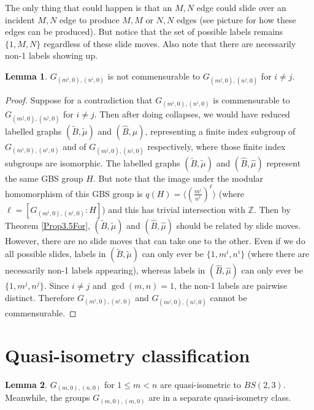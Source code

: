 \documentclass[10pt]{article}
\def\integers{{\mathbb{Z}}}
\theoremstyle{definition}
\newtheorem{lemma}{Lemma}
\begin{document}
The only thing that could happen is that an $M,N$ edge could slide over an incident $M,N$ edge to produce $M,M$ or $N,N$ edges (see picture for how these edges can be produced). But notice that the set of possible labels remains $\{1,M,N\}$ regardless of these slide moves. Also note that there are necessarily non-1 labels showing up. 

\begin{lemma}
    $G_{(m^i,0),(n^i,0)}$ is not commensurable to $G_{(m^j,0),(n^j,0)}$ for $i\ne j$. 
\end{lemma}
\begin{proof}
    Suppose for a contradiction that $G_{(m^i,0),(n^i,0)}$ is commensurable to $G_{(m^j,0),(n^j,0)}$ for $i\ne j$. Then  after doing collapses, we would have reduced labelled graphs $(\widetilde{B}, \widetilde{\mu})$ and $(\widehat{B}, \widehat{\mu})$, representing a finite index subgroup of $G_{(m^i,0),(n^i,0)}$ and of $G_{(m^j,0),(n^j,0)}$ respectively, where those finite index subgroups are isomorphic. The labelled graphs $(\widetilde{B}, \widetilde{\mu})$ and $(\widehat{B}, \widehat{\mu})$ represent the same GBS group $H$. But note that the image under the modular homomorphism of this GBS group is $q(H) = \langle \left(\frac{m^i}{n^i} \right)^\ell\rangle $ (where $\ell=[G_{(m^i,0),(n^i,0)}:H]$) and this has trivial intersection with $\integers$. Then by Theorem \ref{Prop3.5For}, $(\widetilde{B}, \widetilde{\mu})$ and $(\widehat{B}, \widehat{\mu})$ should be related by slide moves. However, there are no slide moves that can take one to the other. Even if we do all possible slides, labels in $(\widetilde{B}, \widetilde{\mu})$ can only ever be $\{1,m^i, n^i\}$ (where there are necessarily non-1 labels  appearing), whereas labels in $(\widehat{B}, \widehat{\mu})$ can only ever be $\{1,m^j,n^j\}$. Since $i\ne j$ and $\gcd(m,n)=1$, the non-1 labels are pairwise distinct. Therefore $G_{(m^i,0),(n^i,0)}$ and $G_{(m^j,0),(n^j,0)}$ cannot  be commensurable. 
\end{proof}



\section{Quasi-isometry classification}
\begin{lemma}
    $G_{(m,0),(n,0)}$ for $1 \leq m < n$ are quasi-isometric to $BS(2,3)$. Meanwhile, the groups $G_{(m,0),(m,0)}$ are in a separate quasi-isometry class. 
\end{lemma}
\end{document}

